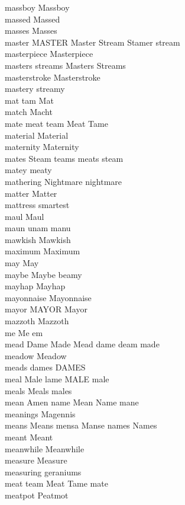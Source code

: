 massboy Massboy\\
massed Massed\\
masses Masses\\
master MASTER Master Stream Stamer stream\\
masterpiece Masterpiece\\
masters streams Masters Streams\\
masterstroke Masterstroke\\
mastery streamy\\
mat tam Mat\\
match Macht\\
mate meat team Meat Tame\\
material Material\\
maternity Maternity\\
mates Steam teams meats steam\\
matey meaty\\
mathering Nightmare nightmare\\
matter Matter\\
mattress smartest\\
maul Maul\\
maun unam manu\\
mawkish Mawkish\\
maximum Maximum\\
may May\\
maybe Maybe beamy\\
mayhap Mayhap\\
mayonnaise Mayonnaise\\
mayor MAYOR Mayor\\
mazzoth Mazzoth\\
me Me em\\
mead Dame Made Mead dame deam made\\
meadow Meadow\\
meads dames DAMES\\
meal Male lame MALE male\\
meals Meals males\\
mean Amen name Mean Name mane\\
meanings Magennis\\
means Means mensa Manse names Names\\
meant Meant\\
meanwhile Meanwhile\\
measure Measure\\
measuring geraniums\\
meat team Meat Tame mate\\
meatpot Peatmot\\
